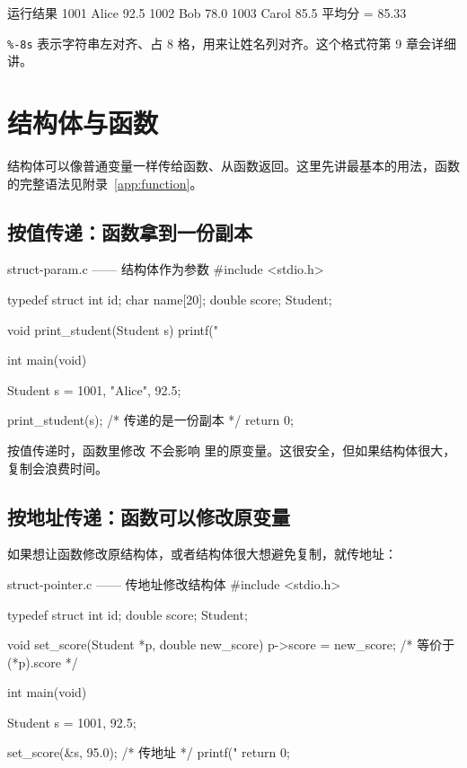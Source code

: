 \begin{outbox}{运行结果}
1001 Alice    92.5
1002 Bob      78.0
1003 Carol    85.5
平均分 = 85.33
\end{outbox}

\begin{note}
\texttt{\%-8s} 表示字符串左对齐、占 8 格，用来让姓名列对齐。这个格式符第 9 章会详细讲。
\end{note}

\section{结构体与函数}

结构体可以像普通变量一样传给函数、从函数返回。这里先讲最基本的用法，函数的完整语法见附录~\ref{app:function}。

\subsection{按值传递：函数拿到一份副本}

\begin{codebox}{struct-param.c —— 结构体作为参数}
#include <stdio.h>

typedef struct {
    int id;
    char name[20];
    double score;
} Student;

void print_student(Student s)
{
    printf("%
}

int main(void)
{
    Student s = {1001, "Alice", 92.5};

    print_student(s);       /* 传递的是一份副本 */
    return 0;
}
\end{codebox}

按值传递时，函数里修改  不会影响  里的原变量。这很安全，但如果结构体很大，复制会浪费时间。

\subsection{按地址传递：函数可以修改原变量}

如果想让函数修改原结构体，或者结构体很大想避免复制，就传地址：

\begin{codebox}{struct-pointer.c —— 传地址修改结构体}
#include <stdio.h>

typedef struct {
    int id;
    double score;
} Student;

void set_score(Student *p, double new_score)
{
    p->score = new_score;       /* 等价于 (*p).score */
}

int main(void)
{
    Student s = {1001, 92.5};

    set_score(&s, 95.0);        /* 传地址 */
    printf("%
    return 0;
}
\end{codebox}

